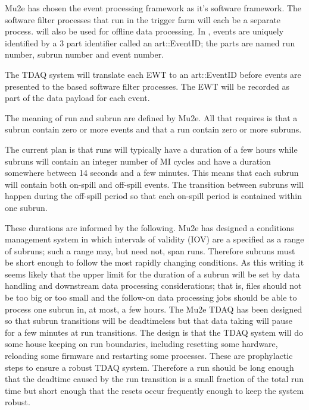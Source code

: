 

Mu2e has chosen the \art event processing framework as it's software framework.
The software filter processes that run in the trigger farm will each be a separate \art process.
\art will also be used for offline data processing.
In \art, events are uniquely identified by a 3 part identifier called an
{\code art::EventID}; the parts are named run number, subrun number
and event number.

The TDAQ system will translate each EWT to an {\code art::EventID}
before events are presented to the \art based software filter processes.
The EWT will be recorded as part of the data payload for each event.


The meaning of run and subrun are defined by Mu2e.
All that \art requires is that a subrun contain zero or more
events and that a run contain zero or more subruns.

The current plan is that runs will typically have a duration of a few hours
while subruns will contain an integer number of MI cycles and
have a duration somewhere between 14 seconds and a few minutes.
This means that each subrun will contain both on-spill and
off-spill events.   The transition between subruns will
happen during the off-spill period so that each on-spill
period is contained within one subrun.

These durations are informed by the following.
Mu2e has designed a conditions management system
in which intervals of validity (IOV) are a specified as a range of subruns;
such a range may, but need not, span runs.
Therefore subruns must be short enough to follow the most
rapidly changing conditions.  As this writing it seems
likely that the upper limit for the duration of a subrun will
be set by data handling and downstream data processing considerations;
that is, files should not be too big or too small
and the follow-on data processing jobs should be able to process one subrun
in, at most, a few hours.
The Mu2e TDAQ has been designed so that subrun transitions will be deadtimeless
but that data taking will pause for a few minutes at run transitions.
The design is that the TDAQ system will do some house keeping
on run boundaries, including resetting some hardware, reloading
some firmware and restarting some processes.
These are prophylactic steps to ensure a robust TDAQ system.
Therefore a run should be long enough that the deadtime
caused by the run transition is a small fraction of the total run time
but short enough that the resets occur frequently enough
to keep the system robust.

